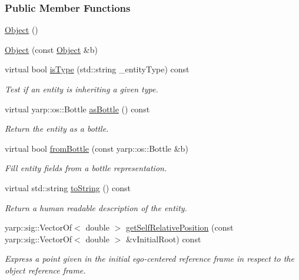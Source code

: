 \subsubsection*{Public Member Functions}
\begin{DoxyCompactItemize}
\item 
\hyperlink{group__icubclient__representations_a40860402e64d8008fb42329df7097cdb}{Object} ()
\item 
\hyperlink{group__icubclient__representations_a770d7836e04c192a8207168888bf7889}{Object} (const \hyperlink{group__icubclient__representations_classicubclient_1_1Object}{Object} \&b)
\item 
virtual bool \hyperlink{group__icubclient__representations_a90398d2c9cc2a42617b50fcbc4533734}{is\+Type} (std\+::string \+\_\+entity\+Type) const
\begin{DoxyCompactList}\small\item\em Test if an entity is inheriting a given type. \end{DoxyCompactList}\item 
virtual yarp\+::os\+::\+Bottle \hyperlink{group__icubclient__representations_a60acd95fa583dc758f2b76e1968a7ea2}{as\+Bottle} () const
\begin{DoxyCompactList}\small\item\em Return the entity as a bottle. \end{DoxyCompactList}\item 
virtual bool \hyperlink{group__icubclient__representations_ab5662af99b6bfa7d3996192c62536bf1}{from\+Bottle} (const yarp\+::os\+::\+Bottle \&b)
\begin{DoxyCompactList}\small\item\em Fill entity fields from a bottle representation. \end{DoxyCompactList}\item 
virtual std\+::string \hyperlink{group__icubclient__representations_aef5180c43e05c572865ad38ff650b930}{to\+String} () const
\begin{DoxyCompactList}\small\item\em Return a human readable description of the entity. \end{DoxyCompactList}\item 
yarp\+::sig\+::\+Vector\+Of$<$ double $>$ \hyperlink{group__icubclient__representations_a79b1df29bd8ca51d6659e720081b87a4}{get\+Self\+Relative\+Position} (const yarp\+::sig\+::\+Vector\+Of$<$ double $>$ \&v\+Initial\+Root) const
\begin{DoxyCompactList}\small\item\em Express a point given in the initial ego-\/centered reference frame in respect to the object reference frame. \end{DoxyCompactList}\item 

\end{DoxyCompactItemize}
